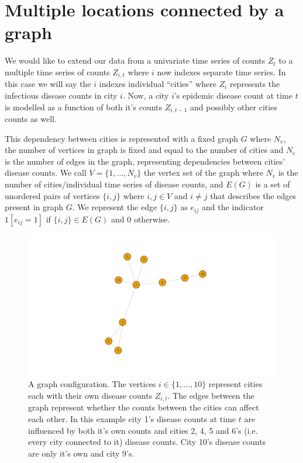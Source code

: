 \documentclass[11pt,a4paper]{article}
\numberwithin{equation}{section}
\begin{document}
\hypertarget{multiple-locations-connected-by-a-graph}{%
\section{Multiple locations connected by a
graph}\label{multiple-locations-connected-by-a-graph}}

We would like to extend our data from a univariate time series of counts
\(Z_t\) to a multiple time series of counts \(Z_{i,t}\) where \(i\) now
indexes separate time series. In this case we will say the \(i\) indexes
individual ``cities'' where \(Z_i\) represents the infectious disease
counts in city \(i\). Now, a city \(i\)'s epidemic disease count at time
\(t\) is modelled as a function of both it's counts \(Z_{i,t-1}\) and
possibly other cities counts as well.

This dependency between cities is represented with a fixed graph \(G\)
where \(N_v\), the number of vertices in graph is fixed and equal to the
number of cities and \(N_e\) is the number of edges in the graph,
representing dependencies between cities' disease counts. We call
\(V = \{1,\dots,N_v \}\) the vertex set of the graph where \(N_v\) is
the number of cities/individual time series of disease counts, and
\(E(G)\) is a set of unordered pairs of vertices \(\{i,j\}\) where
\(i,j \in V\) and \(i \neq j\) that describes the edges present in graph
\(G\). We represent the edge \(\{i,j\}\) as \(e_{ij}\) and the indicator
\(1[e_{ij}=1]\) if \(\{i,j\} \in E(G)\) and 0 otherwise.

\begin{figure}
\includegraphics[trim={1 2cm 0 2cm},clip]{thesis_draft_files/figure-latex/unnamed-chunk-1-1} \caption{\label{fig:graph example} A graph configuration. The vertices $i \in \{1,\dots, 10\}$ represent cities each with their own disease counts          $Z_{i,t}$. The edges between the graph represent whether the counts between the cities can affect each other. In this example city 1's disease counts at time $t$ are influenced by both it's own counts and cities 2, 4, 5 and 6's (i.e. every city connected to it) disease counts. City 10's disease counts are only it's own and city 9's.}\label{fig:unnamed-chunk-1}
\end{figure}
\end{document}
